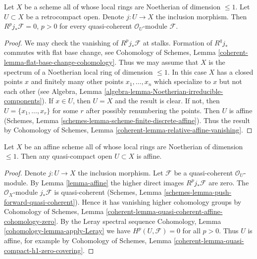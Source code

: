 \begin{lemma}
\label{lemma-affine}
Let $X$ be a scheme all of whose local rings are Noetherian of dimension
$\leq 1$. Let $U \subset X$ be a retrocompact open. Denote
$j : U \to X$ the inclusion morphism. Then $R^pj_*\mathcal{F} = 0$, $p > 0$
for every quasi-coherent $\mathcal{O}_U$-module $\mathcal{F}$.
\end{lemma}

\begin{proof}
We may check the vanishing of $R^pj_*\mathcal{F}$ at stalks.
Formation of $R^qj_*$ commutes with flat base change, see
Cohomology of Schemes, Lemma
\ref{coherent-lemma-flat-base-change-cohomology}.
Thus we may assume that $X$ is the spectrum of a Noetherian local
ring of dimension $\leq 1$. In this case $X$ has a closed points
$x$ and finitely many other points $x_1, \ldots, x_n$ which specialize
to $x$ but not each other (see
Algebra, Lemma \ref{algebra-lemma-Noetherian-irreducible-components}).
If $x \in U$, then $U = X$ and the result is clear. If not, then
$U = \{x_1, \ldots, x_r\}$ for some $r$ after possibly renumbering
the points. Then $U$ is affine
(Schemes, Lemma \ref{schemes-lemma-scheme-finite-discrete-affine}).
Thus the result by Cohomology of Schemes, Lemma
\ref{coherent-lemma-relative-affine-vanishing}.
\end{proof}

\begin{lemma}
\label{lemma-open-in-affine-curve-affine}
Let $X$ be an affine scheme all of whose local rings are Noetherian
of dimension $\leq 1$. Then any quasi-compact open $U \subset X$ is affine.
\end{lemma}

\begin{proof}
Denote $j : U \to X$ the inclusion morphism. Let $\mathcal{F}$
be a quasi-coherent $\mathcal{O}_U$-module.
By Lemma \ref{lemma-affine} the higher direct images
$R^pj_*\mathcal{F}$ are zero. The $\mathcal{O}_X$-module $j_*\mathcal{F}$
is quasi-coherent
(Schemes, Lemma \ref{schemes-lemma-push-forward-quasi-coherent}).
Hence it has vanishing higher cohomology groups by
Cohomology of Schemes, Lemma
\ref{coherent-lemma-quasi-coherent-affine-cohomology-zero}.
By the Leray spectral sequence
Cohomology, Lemma \ref{cohomology-lemma-apply-Leray}
we have $H^p(U, \mathcal{F}) = 0$ for all $p > 0$.
Thus $U$ is affine, for example by
Cohomology of Schemes, Lemma
\ref{coherent-lemma-quasi-compact-h1-zero-covering}.
\end{proof}

